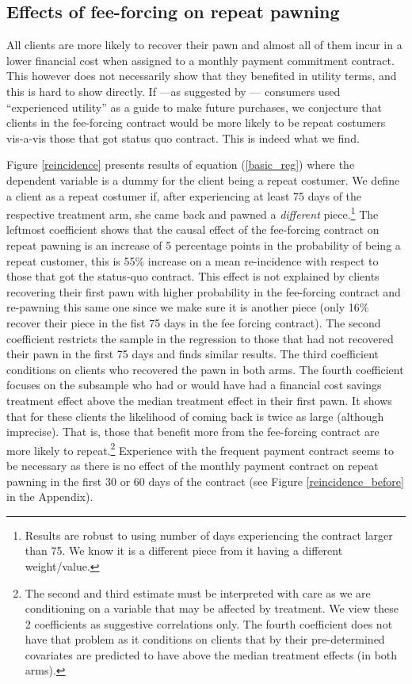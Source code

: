 \documentclass[oneside,11pt]{article}
\begin{document}
\subsection{Effects of fee-forcing on repeat pawning}

All clients are more likely to recover their pawn and almost all of them incur in a lower financial cost when assigned to a monthly payment commitment contract. This however does not necessarily show that they benefited in utility terms, and this is hard to show directly. If ---as suggested by \cite{Laibson2018}--- consumers used ``experienced utility'' as a guide to make future purchases, we conjecture that clients in the fee-forcing contract would be more likely to be repeat costumers vis-a-vis those that got status quo contract. This is indeed what we find. 

Figure \ref{reincidence} presents results of equation (\ref{basic_reg}) where the dependent variable is a dummy for the client being a repeat costumer. We define a client as a repeat costumer if, after experiencing at least 75 days of the respective treatment arm, she came back and pawned a \textit{different} piece.\footnote{Results are robust to using number of days experiencing the contract larger than 75. We know it is a different piece from it having a different weight/value.}  The leftmost coefficient shows that the causal effect of the fee-forcing contract on repeat pawning is an increase of 5 percentage points in the probability of being a repeat customer, this is 55\% increase on a mean re-incidence with respect to those that got the status-quo contract. This effect is not explained by clients recovering their first pawn with higher probability in the fee-forcing contract and re-pawning this same one since we make sure it is another piece (only 16\% recover their piece in the fist 75 days in the fee forcing contract). The second coefficient restricts the sample in the regression to those that had not recovered their pawn in the first 75 days and finds similar results. The third coefficient conditions on clients who recovered the pawn in both arms. The fourth coefficient focuses on the subsample who had or would have had a financial cost savings treatment effect above the median treatment effect in their first pawn. It shows that for these clients the likelihood of coming back is twice as large (although imprecise). That is, those that benefit more from the fee-forcing contract are more likely to repeat.\footnote{The second and third estimate must be interpreted with care as we are conditioning on a variable that may be affected by treatment. We view these 2 coefficients as suggestive correlations only. The fourth coefficient does not have that problem as it conditions on clients that by their pre-determined covariates are predicted to have above the median treatment effects (in both arms).} Experience with the frequent payment contract seems to be necessary as there is no effect of the monthly payment contract on repeat pawning in the first 30 or 60 days of the contract (see Figure \ref{reincidence_before} in the Appendix). %
\end{document}

